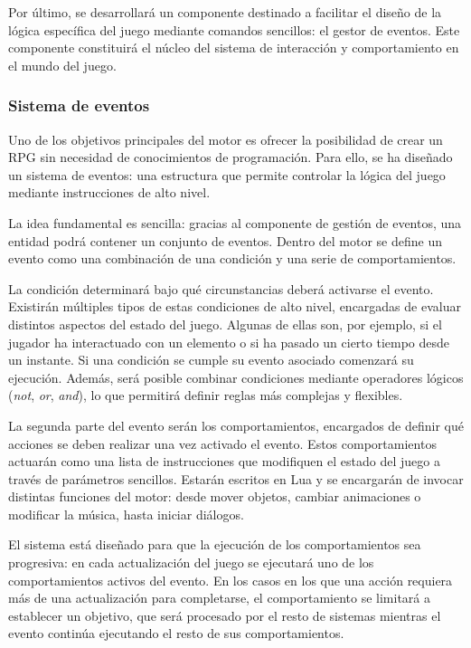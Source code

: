 \medskip

Por último, se desarrollará un componente destinado a facilitar el diseño de la lógica específica del juego mediante comandos sencillos: el gestor de eventos. Este componente constituirá el núcleo del sistema de interacción y comportamiento en el mundo del juego.

\subsubsection{Sistema de eventos}
Uno de los objetivos principales del motor es ofrecer la posibilidad de crear un RPG sin necesidad de conocimientos de programación. Para ello, se ha diseñado un sistema de eventos: una estructura que permite controlar la lógica del juego mediante instrucciones de alto nivel.

\medskip

La idea fundamental es sencilla: gracias al componente de gestión de eventos, una entidad podrá contener un conjunto de eventos. Dentro del motor se define un evento como una combinación de una condición y una serie de comportamientos.

\medskip

La condición determinará bajo qué circunstancias deberá activarse el evento. Existirán múltiples tipos de estas condiciones de alto nivel, encargadas de evaluar distintos aspectos del estado del juego. Algunas de ellas son, por ejemplo, si el jugador ha interactuado con un elemento o si ha pasado un cierto tiempo desde un instante. Si una condición se cumple su evento asociado comenzará su ejecución. Además, será posible combinar condiciones mediante operadores lógicos (\textit{not}, \textit{or}, \textit{and}), lo que permitirá definir reglas más complejas y flexibles.

\medskip

La segunda parte del evento serán los comportamientos, encargados de definir qué acciones se deben realizar una vez activado el evento. Estos comportamientos actuarán como una lista de instrucciones que modifiquen el estado del juego a través de parámetros sencillos. Estarán escritos en Lua y se encargarán de invocar distintas funciones del motor: desde mover objetos, cambiar animaciones o modificar la música, hasta iniciar diálogos.

\medskip

El sistema está diseñado para que la ejecución de los comportamientos sea progresiva: en cada actualización del juego se ejecutará uno de los comportamientos activos del evento. En los casos en los que una acción requiera más de una actualización para completarse, el comportamiento se limitará a establecer un objetivo, que será procesado por el resto de sistemas mientras el evento continúa ejecutando el resto de sus comportamientos.

